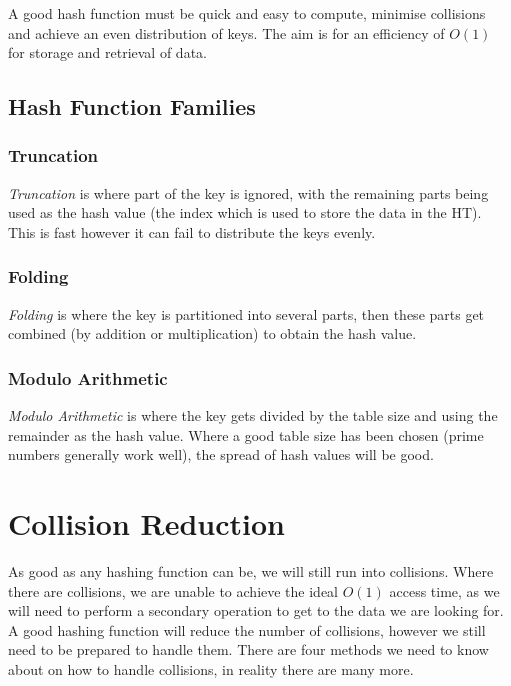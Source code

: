 A good hash function must be quick and easy to compute, minimise collisions and achieve an even distribution of keys. The aim is for an efficiency of $O(1)$ for storage and retrieval of data.

\subsection{Hash Function Families}
\subsubsection{Truncation}
\textit{Truncation} is where part of the key is ignored, with the remaining parts being used as the hash value (the index which is used to store the data in the HT). This is fast however it can fail to distribute the keys evenly.
\subsubsection{Folding}
\textit{Folding} is where the key is partitioned into several parts, then these parts get combined (by addition or multiplication) to obtain the hash value.
\subsubsection{Modulo Arithmetic}
\textit{Modulo Arithmetic} is where the key gets divided by the table size and using the remainder as the hash value. Where a good table size has been chosen (prime numbers generally work well), the spread of hash values will be good. 

\section{Collision Reduction}
As good as any hashing function can be, we will still run into collisions. Where there are collisions, we are unable to achieve the ideal $O(1)$ access time, as we will need to perform a secondary operation to get to the data we are looking for. A good hashing function will reduce the number of collisions, however we still need to be prepared to handle them. There are four methods we need to know about on how to handle collisions, in reality there are many more.
